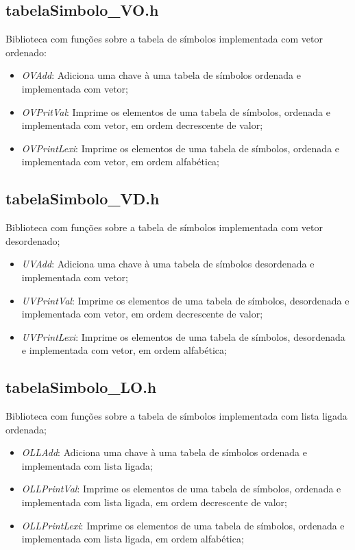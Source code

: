 \documentclass[12pt, a4paper]{article} %
\begin{document}
	\subsection{tabelaSimbolo\_VO.h}
	Biblioteca com funções sobre a tabela de símbolos implementada com vetor ordenado:
	\begin{itemize}
		\item \textit{OVAdd}: Adiciona uma chave à uma tabela de símbolos ordenada e implementada com vetor;
		\item \textit{OVPritVal}: Imprime os elementos de uma tabela de símbolos, ordenada e implementada com vetor, em ordem decrescente de valor;
		\item \textit{OVPrintLexi}: Imprime os elementos de uma tabela de símbolos, ordenada e implementada com vetor, em ordem alfabética; 
	\end{itemize}

	\subsection{tabelaSimbolo\_VD.h}
	Biblioteca com funções sobre a tabela de símbolos implementada com vetor desordenado;
	\begin{itemize}
		\item \textit{UVAdd}: Adiciona uma chave à uma tabela de símbolos desordenada e implementada com vetor;
		\item \textit{UVPrintVal}: Imprime os elementos de uma tabela de símbolos, desordenada e implementada com vetor, em ordem decrescente de valor;
		\item \textit{UVPrintLexi}: Imprime os elementos de uma tabela de símbolos, desordenada e implementada com vetor, em ordem alfabética; 
	\end{itemize}

	\subsection{tabelaSimbolo\_LO.h}
	Biblioteca com funções sobre a tabela de símbolos implementada com lista ligada ordenada;
	\begin{itemize}
		\item \textit{OLLAdd}: Adiciona uma chave à uma tabela de símbolos ordenada e implementada com lista ligada;
		\item \textit{OLLPrintVal}: Imprime os elementos de uma tabela de símbolos, ordenada e implementada com lista ligada, em ordem decrescente de valor;
		\item \textit{OLLPrintLexi}: Imprime os elementos de uma tabela de símbolos, ordenada e implementada com lista ligada, em ordem alfabética; 
	\end{itemize}
\end{document}
